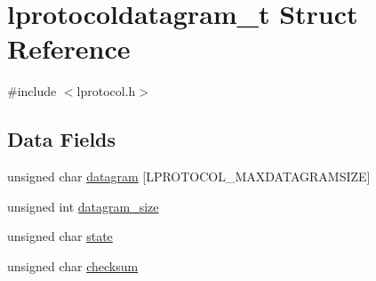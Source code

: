 \hypertarget{structlprotocoldatagram__t}{
\section{lprotocoldatagram\_\-t Struct Reference}
\label{structlprotocoldatagram__t}
}


{\ttfamily \#include $<$lprotocol.h$>$}\subsection*{Data Fields}
\begin{DoxyCompactItemize}
\item 
unsigned char \hyperlink{structlprotocoldatagram__t_ac043096550aa0fa5af46c3e241d24f17}{datagram} \mbox{[}LPROTOCOL\_\-MAXDATAGRAMSIZE\mbox{]}
\item 
unsigned int \hyperlink{structlprotocoldatagram__t_acccd9d4f589b3930c285f2dd4fdeb4bf}{datagram\_\-size}
\item 
unsigned char \hyperlink{structlprotocoldatagram__t_ab12828525693568ae9c217805bea1ef9}{state}
\item 
unsigned char \hyperlink{structlprotocoldatagram__t_a876c647471f5dc4279209ebe0ce3ebc5}{checksum}
\end{DoxyCompactItemize}


